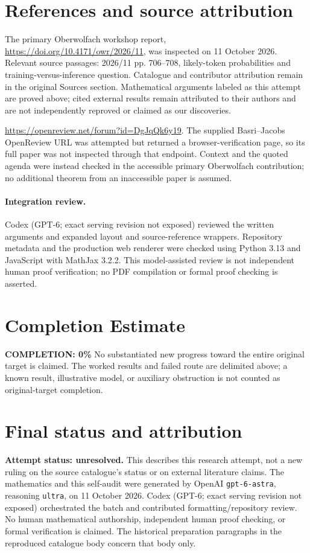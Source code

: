 \documentclass[11pt]{article}
\begin{document}
\section{References and source attribution}
The primary Oberwolfach workshop report, \url{https://doi.org/10.4171/owr/2026/11}, was inspected on 11 October 2026. Relevant source passages: 2026/11 pp. 706--708, likely-token probabilities and training-versus-inference question. Catalogue and contributor attribution remain in the original Sources section. Mathematical arguments labeled as this attempt are proved above; cited external results remain attributed to their authors and are not independently reproved or claimed as our discoveries.

\url{https://openreview.net/forum?id=DgJqQk6y19}. The supplied Basri--Jacobs OpenReview URL was attempted but returned a browser-verification page, so its full paper was not inspected through that endpoint. Context and the quoted agenda were instead checked in the accessible primary Oberwolfach contribution; no additional theorem from an inaccessible paper is assumed.


\paragraph{Integration review.} Codex (GPT-6; exact serving revision not exposed) reviewed the written arguments and expanded layout and source-reference wrappers. Repository metadata and the production web renderer were checked using Python 3.13 and JavaScript with MathJax 3.2.2. This model-assisted review is not independent human proof verification; no PDF compilation or formal proof checking is asserted.

\section{Completion Estimate}
\noindent\textbf{COMPLETION: 0\%}
No substantiated new progress toward the entire original target is claimed. The worked results and failed route are delimited above; a known result, illustrative model, or auxiliary obstruction is not counted as original-target completion.

\section{Final status and attribution}
\textbf{Attempt status: unresolved.} This describes this research attempt, not a new ruling on the source catalogue's status or on external literature claims.
The mathematics and this self-audit were generated by OpenAI \texttt{gpt-6-astra}, reasoning \texttt{ultra}, on 11 October 2026. Codex (GPT-6; exact serving revision not exposed) orchestrated the batch and contributed formatting/repository review. No human mathematical authorship, independent human proof checking, or formal verification is claimed. The historical preparation paragraphs in the reproduced catalogue body concern that body only.
\end{document}
